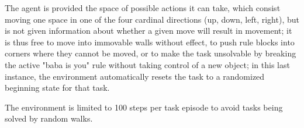 The agent is provided the space of possible actions it can take, which consist moving one space in one of the four cardinal directions (up, down, left, right), but is not given information about whether a given move will result in movement; it is thus free to move into immovable walls without effect, to push rule blocks into corners where they cannot be moved, or to make the task unsolvable by breaking the active "baba is you" rule without taking control of a new object; in this last instance, the environment automatically resets the task to a randomized beginning state for that task.

The environment is limited to 100 steps per task episode to avoid tasks being solved by random walks.